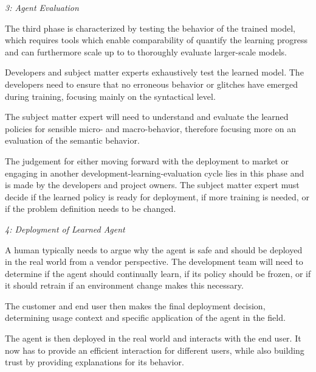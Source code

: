 \documentclass[twoside,11pt]{article}
\begin{document}
\emph{3: Agent Evaluation}

The third phase is characterized by testing the behavior of the trained model, which requires tools which enable comparability of quantify the learning progress and can furthermore scale up to to thoroughly evaluate larger-scale models.

Developers and subject matter experts exhaustively test the learned model.
The developers need to ensure that no erroneous behavior or glitches have emerged during training, focusing mainly on the syntactical level. 

The subject matter expert will need to understand and evaluate the learned policies for sensible micro- and macro-behavior, therefore focusing more on an evaluation of the semantic behavior. 

The judgement for either moving forward with the deployment to market or engaging in another development-learning-evaluation cycle lies in this phase and is made by the developers and project owners. The subject matter expert must decide if the learned policy is ready for deployment, if more training is needed, or if the problem definition needs to be changed. 
\vspace{2mm}

\emph{4: Deployment of Learned Agent}

A human typically needs to argue why the agent is safe and should be deployed in the real world from a vendor perspective. The development team will need to determine if the agent should continually learn, if its policy should be frozen, or if it should retrain if an environment change makes this necessary.  

The customer and end user then makes the final deployment decision, determining usage context and specific application of the agent in the field.

The agent is then deployed in the real world and interacts with the end user. It now has to provide an efficient interaction for different users, while also building trust by providing explanations for its behavior.
\vspace{2mm}
\end{document}
